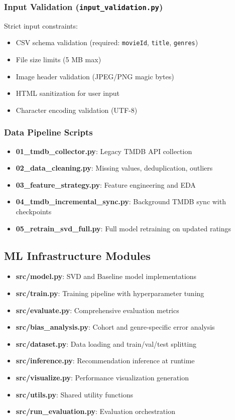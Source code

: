 \documentclass[11pt,a4paper]{article}
\begin{document}
\subsubsection{Input Validation (\texttt{input\_validation.py})}

Strict input constraints:

\begin{itemize}
    \item CSV schema validation (required: \texttt{movieId}, \texttt{title}, \texttt{genres})
    \item File size limits (5 MB max)
    \item Image header validation (JPEG/PNG magic bytes)
    \item HTML sanitization for user input
    \item Character encoding validation (UTF-8)
\end{itemize}

\subsubsection{Data Pipeline Scripts}

\begin{itemize}
    \item \textbf{01\_tmdb\_collector.py}: Legacy TMDB API collection
    \item \textbf{02\_data\_cleaning.py}: Missing values, deduplication, outliers
    \item \textbf{03\_feature\_strategy.py}: Feature engineering and EDA
    \item \textbf{04\_tmdb\_incremental\_sync.py}: Background TMDB sync with checkpoints
    \item \textbf{05\_retrain\_svd\_full.py}: Full model retraining on updated ratings
\end{itemize}

\subsection{ML Infrastructure Modules}

\begin{itemize}
    \item \textbf{src/model.py}: SVD and Baseline model implementations
    \item \textbf{src/train.py}: Training pipeline with hyperparameter tuning
    \item \textbf{src/evaluate.py}: Comprehensive evaluation metrics
    \item \textbf{src/bias\_analysis.py}: Cohort and genre-specific error analysis
    \item \textbf{src/dataset.py}: Data loading and train/val/test splitting
    \item \textbf{src/inference.py}: Recommendation inference at runtime
    \item \textbf{src/visualize.py}: Performance visualization generation
    \item \textbf{src/utils.py}: Shared utility functions
    \item \textbf{src/run\_evaluation.py}: Evaluation orchestration
\end{itemize}
\end{document}
